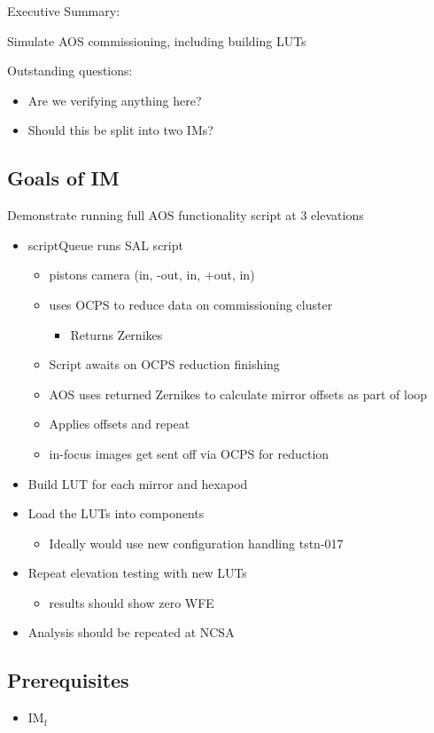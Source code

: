 
Executive Summary:

Simulate AOS commissioning, including building LUTs

Outstanding questions:
\begin{itemize}
\item Are we verifying anything here?
\item Should this be split into two IMs?
\end{itemize}

\subsection{Goals of IM}
Demonstrate running full AOS functionality script at 3 elevations
\begin{itemize}
\item scriptQueue runs SAL script
  \begin{itemize}
  \item pistons camera (in, -out, in, +out, in)
  \item uses \gls{OCPS} to reduce data on commissioning cluster
    \begin{itemize}
    \item Returns Zernikes
    \end{itemize}
  \item Script awaits on \gls{OCPS} reduction finishing
  \item AOS uses returned Zernikes to calculate mirror offsets as part of loop
  \item Applies offsets and repeat
  \item in-focus images get sent off via \gls{OCPS} for reduction
  \end{itemize}
\end{itemize}
\begin{itemize}
\item Build LUT for each mirror and hexapod
\item Load the LUTs into components
  \begin{itemize}
  \item Ideally would use new configuration handling tstn-017
  \end{itemize}
\item Repeat elevation testing with new LUTs
  \begin{itemize}
  \item results should show zero WFE
  \end{itemize}
\item Analysis should be repeated at NCSA
\end{itemize}

\subsection{Prerequisites}
\begin{itemize}
\item IM\(_{\text{f}}\)
\end{itemize}
